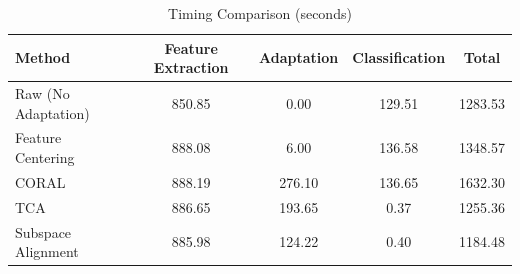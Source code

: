 \begin{table}[htbp]
\centering
\caption{Timing Comparison (seconds)}
\label{tab:timing}
\begin{tabular}{lcccc}
\toprule
Method & Feature Extraction & Adaptation & Classification & Total \\
\midrule
Raw (No Adaptation) & 850.85 & 0.00 & 129.51 & 1283.53 \\
Feature Centering & 888.08 & 6.00 & 136.58 & 1348.57 \\
CORAL & 888.19 & 276.10 & 136.65 & 1632.30 \\
TCA & 886.65 & 193.65 & 0.37 & 1255.36 \\
Subspace Alignment & 885.98 & 124.22 & 0.40 & 1184.48 \\
\bottomrule
\end{tabular}
\end{table}